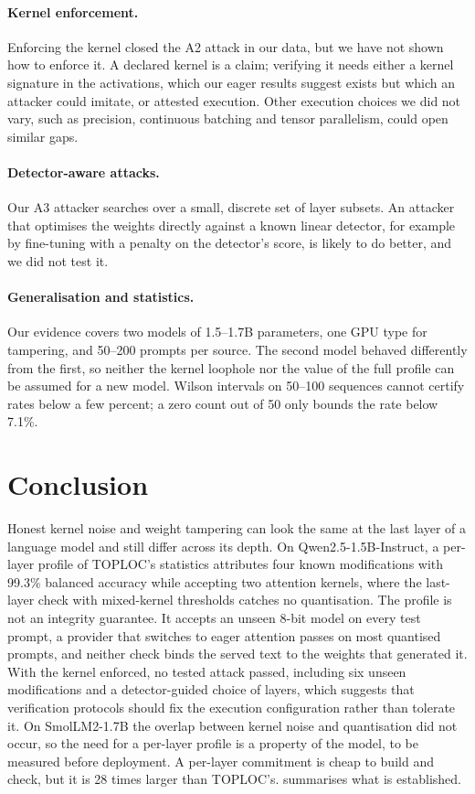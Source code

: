 \documentclass[11pt]{article}
\begin{document}
\paragraph{Kernel enforcement.}
Enforcing the kernel closed the A2 attack in our data, but we have not shown how to enforce it.
A declared kernel is a claim; verifying it needs either a kernel signature in the activations, which our eager results suggest exists but which an attacker could imitate, or attested execution.
Other execution choices we did not vary, such as precision, continuous batching and tensor parallelism, could open similar gaps.

\paragraph{Detector-aware attacks.}
Our A3 attacker searches over a small, discrete set of layer subsets.
An attacker that optimises the weights directly against a known linear detector, for example by fine-tuning with a penalty on the detector's score, is likely to do better, and we did not test it.

\paragraph{Generalisation and statistics.}
Our evidence covers two models of 1.5--1.7B parameters, one GPU type for tampering, and 50--200 prompts per source.
The second model behaved differently from the first, so neither the kernel loophole nor the value of the full profile can be assumed for a new model.
Wilson intervals on 50--100 sequences cannot certify rates below a few percent; a zero count out of 50 only bounds the rate below 7.1\%.

\section{Conclusion}
\label{sec:conclusion}

Honest kernel noise and weight tampering can look the same at the last layer of a language model and still differ across its depth.
On Qwen2.5-1.5B-Instruct, a per-layer profile of TOPLOC's statistics attributes four known modifications with 99.3\% balanced accuracy while accepting two attention kernels, where the last-layer check with mixed-kernel thresholds catches no quantisation.
The profile is not an integrity guarantee.
It accepts an unseen 8-bit model on every test prompt, a provider that switches to eager attention passes on most quantised prompts, and neither check binds the served text to the weights that generated it.
With the kernel enforced, no tested attack passed, including six unseen modifications and a detector-guided choice of layers, which suggests that verification protocols should fix the execution configuration rather than tolerate it.
On SmolLM2-1.7B the overlap between kernel noise and quantisation did not occur, so the need for a per-layer profile is a property of the model, to be measured before deployment.
A per-layer commitment is cheap to build and check, but it is 28 times larger than TOPLOC's.
 summarises what is established.
\end{document}

